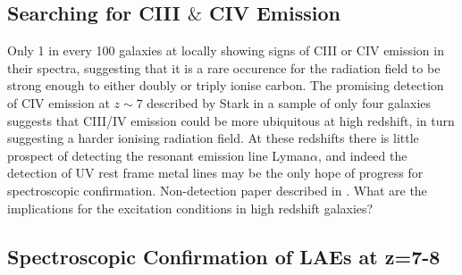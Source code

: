 \documentclass{literature}
\begin{document}
\subsection{Searching for CIII $\&$ CIV Emission}
Only 1 in every 100 galaxies at locally showing signs of CIII or CIV emission in their spectra, suggesting that it is a rare occurence for the radiation field to be strong enough to either doubly or triply ionise carbon. The promising detection of CIV emission at $z \sim 7$ described by Stark \citep{Stark2015} in a sample of only four galaxies suggests that CIII/IV emission could be more ubiquitous at high redshift, in turn suggesting a harder ionising radiation field. At these redshifts there is little prospect of detecting the resonant emission line Lyman$\alpha$, and indeed the detection of UV rest frame metal lines may be the only hope of progress for spectroscopic confirmation. Non-detection paper described in \citep{Zitrin2015}. What are the implications for the excitation conditions in high redshift galaxies? 



\subsection{Spectroscopic Confirmation of LAEs at z=7-8}


\clearpage 

%

\end{document}
